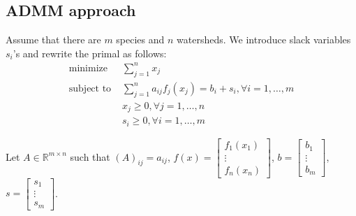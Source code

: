 \documentclass{article}
\newcommand{\R}{{\mathbb{R}}}
\begin{document}
\subsection{ADMM approach}
Assume that there are $m$ species and $n$ watersheds. We introduce slack variables $s_i$'s and rewrite the primal as follows:
\begin{align*}
\text{minimize } & \sum\limits_{j=1}^n x_j\\
\text{subject to } & \sum\limits_{j=1}^n  a_{ij} f_j(x_j) = b_i + s_i, \forall i=1, \ldots, m \\
& x_j \ge 0, \forall j=1,\ldots,n \\
& s_i \ge 0, \forall i=1,\ldots,m
\end{align*}

Let $A \in \R^{m \times n}$ such that $(A)_{ij} = a_{ij}$, $f(x) = 
\begin{bmatrix}
f_1(x_1) \\
\vdots \\
f_n(x_n)
\end{bmatrix}$, 
$b =
\begin{bmatrix}
b_1 \\
\vdots \\
b_m
\end{bmatrix}$,
$s = \begin{bmatrix}
s_1 \\
\vdots \\
s_m
\end{bmatrix}$. \newline
\end{document}
